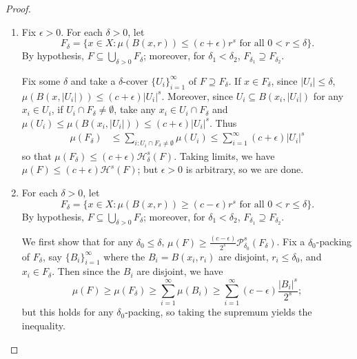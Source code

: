 \documentclass[11pt, a4paper]{memoir}
\theoremstyle{change}
\theoremstyle{plain}
\theoremstyle{nonumberplain}
\newtheorem{proof}{Proof}
\numberwithin{equation}{section}
\begin{document}
\begin{proof}
    \begin{enumerate}[nl,r]
        \item Fix $\epsilon>0$.
            For each $\delta>0$, let
            \begin{equation*}
                F_\delta=\{x\in X:\mu(B(x,r))\leq(c+\epsilon)r^s\text{ for all }0<r\leq\delta\}.
            \end{equation*}
            By hypothesis, $F\subseteq\bigcup_{\delta>0}F_\delta$; moreover, for $\delta_1<\delta_2$, $F_{\delta_1}\supseteq F_{\delta_2}$.

            Fix some $\delta$ and take a $\delta$-cover $\{U_i\}_{i=1}^\infty$ of $F\supseteq F_\delta$.
            If $x\in F_\delta$, since $|U_i|\leq\delta$, $\mu(B(x,|U_i|))\leq(c+\epsilon)|U_i|^s$.
            Moreover, since $U_i\subseteq B(x_i,|U_i|)$ for any $x_i\in U_i$, if $U_i\cap F_\delta\neq\emptyset$, take any $x_i\in U_i\cap F_\delta$ and $\mu(U_i)\leq\mu(B(x_i,|U_i|))\leq(c+\epsilon)|U_i|^s$.
            Thus
            \begin{align*}
                \mu(F_\delta)&\leq\sum_{i:U_i\cap F_\delta\neq\emptyset}\mu(U_i) \leq\sum_{i=1}^\infty(c+\epsilon)|U_i|^s
            \end{align*}
            so that $\mu(F_\delta)\leq (c+\epsilon)\mathcal{H}^s_\delta(F)$.
            Taking limits, we have $\mu(F)\leq(c+\epsilon)\mathcal{H}^s(F)$; but $\epsilon>0$ is arbitrary, so we are done.

        \item
            For each $\delta>0$, let
            \begin{equation*}
                F_\delta=\{x\in X:\mu(B(x,r))\geq(c-\epsilon)r^s\text{ for all }0<r\leq\delta\}.
            \end{equation*}
            By hypothesis, $F\subseteq\bigcup_{\delta >0}F_\delta$; moreover, for $\delta_1<\delta_2$, $F_{\delta_1}\supseteq F_{\delta_2}$.
            
            We first show that for any $\delta_0\leq\delta$, $\mu(F)\geq\frac{(c-\epsilon)}{2^s}\mathcal{P}_{\delta_0}^s(F_\delta)$.
            Fix a $\delta_0$-packing of $F_\delta$, say $\{B_i\}_{i=1}^\infty$ where the $B_i=B(x_i,r_i)$ are disjoint, $r_i\leq\delta_0$, and $x_i\in F_\delta$.
            Then since the $B_i$ are disjoint, we have
            \begin{equation*}
                \mu(F)\geq\mu(F_\delta)\geq\sum_{i=1}^\infty\mu(B_i)\geq\sum_{i=1}^\infty(c-\epsilon)\frac{|B_i|^s}{2^s};
            \end{equation*}
            but this holds for any $\delta_0$-packing, so taking the supremum yields the inequality.


\end{enumerate}
\end{proof}
\end{document}
